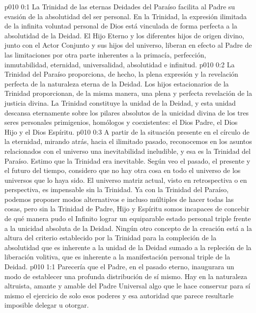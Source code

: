 \author{Censor universal}
\vs p010 0:1 La Trinidad de las eternas Deidades del Paraíso facilita al Padre su evasión de la absolutidad del ser personal. En la Trinidad, la expresión ilimitada de la infinita voluntad personal de Dios está vinculada de forma perfecta a la absolutidad de la Deidad. El Hijo Eterno y los diferentes hijos de origen divino, junto con el Actor Conjunto y sus hijos del universo, liberan en efecto al Padre de las limitaciones por otra parte inherentes a la primacía, perfección, inmutabilidad, eternidad, universalidad, absolutidad e infinitud.
\vs p010 0:2 La Trinidad del Paraíso proporciona, de hecho, la plena expresión y la revelación perfecta de la naturaleza eterna de la Deidad. Los hijos estacionarios de la Trinidad proporcionan, de la misma manera, una plena y perfecta revelación de la justicia divina. La Trinidad constituye la unidad de la Deidad, y esta unidad descansa eternamente sobre los pilares absolutos de la unicidad divina de los tres seres personales primigenios, homólogos y coexistentes: el Dios Padre, el Dios Hijo y el Dios Espíritu.
\vs p010 0:3 \pc A partir de la situación presente en el círculo de la eternidad, mirando atrás, hacia el ilimitado pasado, reconocemos en los asuntos relacionados con el universo una inevitabilidad ineludible, y esa es la Trinidad del Paraíso. Estimo que la Trinidad era inevitable. Según veo el pasado, el presente y el futuro del tiempo, considero que no hay otra cosa en todo el universo de los universos que lo haya sido. El universo matriz actual, visto en retrospectiva o en perspectiva, es impensable sin la Trinidad. Ya con la Trinidad del Paraíso, podemos proponer modos alternativos e incluso múltiples de hacer todas las cosas, pero sin la Trinidad de Padre, Hijo y Espíritu somos incapaces de concebir de qué manera pudo el Infinito lograr un equiparable estado personal triple frente a la unicidad absoluta de la Deidad. Ningún otro concepto de la creación está a la altura del criterio establecido por la Trinidad para la compleción de la absolutidad que es inherente a la unidad de la Deidad sumado a la repleción de la liberación volitiva, que es inherente a la manifestación personal triple de la Deidad.
\vs p010 1:1 Parecería que el Padre, en el pasado eterno, inaugurara un modo de establecer una profunda distribución de sí mismo. Hay en la naturaleza altruista, amante y amable del Padre Universal algo que le hace conservar para sí mismo el ejercicio de solo esos poderes y esa autoridad que parece resultarle imposible delegar u otorgar.
